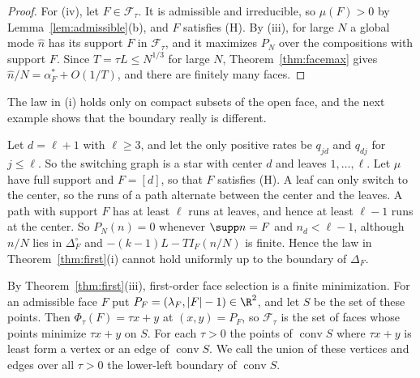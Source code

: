 \begin{proof}
For (iv), let $F\in\mathcal F_\tau$. It is admissible and irreducible, so
$\mu(F)>0$ by Lemma~\ref{lem:admissible}(b), and $F$ satisfies (H). By (iii),
for large $N$ a global mode $\hat n$ has its support $F$ in $\mathcal F_\tau$,
and it maximizes $P_N$ over the compositions with support $F$. Since
$T=\tau L\le N^{1/3}$ for large $N$, Theorem~\ref{thm:facemax} gives
$\hat n/N=\alpha^*_F+O(1/T)$, and there are finitely many faces.
\end{proof}

The law in (i) holds only on compact subsets of the open face, and the next
example shows that the boundary really is different.

\begin{example}\label{ex:star}
Let $d=\ell+1$ with $\ell\ge3$, and let the only positive rates be $q_{jd}$ and
$q_{dj}$ for $j\le\ell$. So the switching graph is a star with center $d$ and
leaves $1,\dots,\ell$. Let $\mu$ have full support and $F=[d]$, so that $F$
satisfies (H). A leaf can only switch to the center, so the runs of a path
alternate between the center and the leaves. A path with support $F$ has at
least $\ell$ runs at leaves, and hence at least $\ell-1$ runs at the center.
So $P_N(n)=0$ whenever $\supp n=F$ and $n_d<\ell-1$, although $n/N$ lies in
$\Delta_F^\circ$ and $-(k-1)L-TI_F(n/N)$ is finite. Hence the law in
Theorem~\ref{thm:first}(i) cannot hold uniformly up to the boundary of
$\Delta_F$.
\end{example}

By Theorem~\ref{thm:first}(iii), first-order face selection is a finite
minimization. For an admissible face $F$ put
$P_F=(\lambda_F,\lvert F\rvert-1)\in\R^2$, and let $S$ be the set of these
points. Then $\Phi_\tau(F)=\tau x+y$ at $(x,y)=P_F$, so $\mathcal F_\tau$ is
the set of faces whose points minimize $\tau x+y$ on $S$. For each $\tau>0$
the points of $\operatorname{conv}S$ where $\tau x+y$ is least form a vertex
or an edge of $\operatorname{conv}S$. We call the union of these vertices and
edges over all $\tau>0$ the lower-left boundary of $\operatorname{conv}S$.

